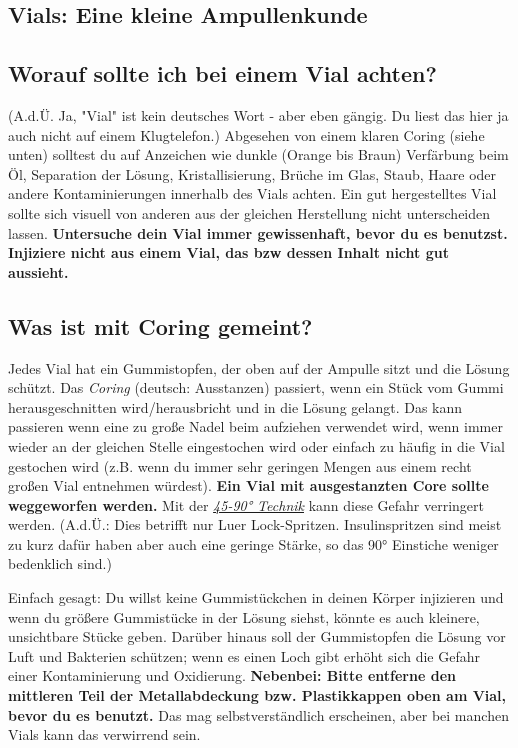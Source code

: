 \documentclass{article}
\begin{document}
\subsection*{Vials: Eine kleine Ampullenkunde}

\subsection{Worauf sollte ich bei einem Vial achten?}

(A.d.Ü. Ja, "Vial" ist kein deutsches Wort - aber eben gängig. Du liest das hier ja auch nicht auf einem Klugtelefon.) Abgesehen von einem klaren Coring (siehe unten) solltest du auf Anzeichen wie dunkle (Orange bis Braun) Verfärbung beim Öl, Separation der Lösung, Kristallisierung, Brüche im Glas, Staub, Haare oder andere Kontaminierungen innerhalb des Vials achten. Ein gut hergestelltes Vial sollte sich visuell von anderen aus der gleichen Herstellung nicht unterscheiden lassen. \textbf{Untersuche dein Vial immer gewissenhaft, bevor du es benutzst. Injiziere nicht aus einem Vial, das bzw dessen Inhalt nicht gut aussieht.}

\subsection{Was ist mit Coring gemeint?}\label{5-23}

Jedes Vial hat ein Gummistopfen, der oben auf der Ampulle sitzt und die Lösung schützt. Das \textit{Coring} (deutsch: Ausstanzen) passiert, wenn ein Stück vom Gummi herausgeschnitten wird/herausbricht und in die Lösung gelangt. Das kann passieren wenn eine zu große Nadel beim aufziehen verwendet wird, wenn immer wieder an der gleichen Stelle eingestochen wird oder einfach zu häufig in die Vial gestochen wird (z.B. wenn du immer sehr geringen Mengen aus einem recht großen Vial entnehmen würdest). \textbf{Ein Vial mit ausgestanzten Core sollte weggeworfen werden. }Mit der \href{https://www.youtube.com/watch?v=w5F0SLoMjC8}{\textit{45-90° Technik}} kann diese Gefahr verringert werden. (A.d.Ü.: Dies betrifft nur Luer Lock-Spritzen. Insulinspritzen sind meist zu kurz dafür haben aber auch eine geringe Stärke, so das 90° Einstiche weniger bedenklich sind.)

Einfach gesagt: Du willst keine Gummistückchen in deinen Körper injizieren und wenn du größere Gummistücke in der Lösung siehst, könnte es auch kleinere, unsichtbare Stücke geben. Darüber hinaus soll der Gummistopfen die Lösung vor Luft und Bakterien schützen; wenn es einen Loch gibt erhöht sich die Gefahr einer Kontaminierung und Oxidierung. \textbf{Nebenbei: Bitte entferne den mittleren Teil der Metallabdeckung bzw. Plastikkappen oben am Vial, bevor du es benutzt. }Das mag selbstverständlich erscheinen, aber bei manchen Vials kann das verwirrend sein. 
\end{document}

